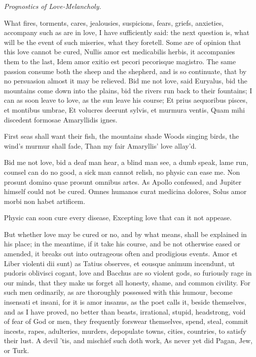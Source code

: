 
\emph{Prognostics of Love-Melancholy.}

What fires, torments, cares, jealousies, suspicions, fears, griefs,
anxieties, accompany such as are in love, I have sufficiently said: the
next question is, what will be the event of such miseries, what they
foretell. Some are of opinion that this love cannot be cured, Nullis
amor est medicabilis herbis, it accompanies them to the last,
Idem amor exitio est pecori pecorisque magistro. The same passion
consume both the sheep and the shepherd, and is so continuate, that by
no persuasion almost it may be relieved. Bid me not love, said
Euryalus, bid the mountains come down into the plains, bid the rivers
run back to their fountains; I can as soon leave to love, as the sun
leave his course;
Et prius aequoribus pisces, et montibus umbrae,
Et volucres deerunt sylvis, et murmura ventis,
Quam mihi discedent formosae Amaryllidis ignes.

First seas shall want their fish, the mountains shade
Woods singing birds, the wind's murmur shall fade,
Than my fair Amaryllis' love allay'd.

Bid me not love, bid a deaf man hear, a blind man see, a dumb speak,
lame run, counsel can do no good, a sick man cannot relish, no physic
can ease me. Non prosunt domino quae prosunt omnibus artes. As Apollo
confessed, and Jupiter himself could not be cured.
Omnes humanos curat medicina dolores,
Solus amor morbi non habet artificem.

Physic can soon cure every disease,
Excepting love that can it not appease.

But whether love may be cured or no, and by what means, shall be
explained in his place; in the meantime, if it take his course, and be
not otherwise eased or amended, it breaks out into outrageous often and
prodigious events. Amor et Liber violenti dii sunt) as Tatius
observes, et eousque animum incendunt, ut pudoris oblivisci cogant,
love and Bacchus are so violent gods, so furiously rage in our minds,
that they make us forget all honesty, shame, and common civility. For
such men ordinarily, as are thoroughly possessed with this humour,
become insensati et insani, for it is amor insanus, as the poet
calls it, beside themselves, and as I have proved, no better than
beasts, irrational, stupid, headstrong, void of fear of God or men,
they frequently forswear themselves, spend, steal, commit incests,
rapes, adulteries, murders, depopulate towns, cities, countries, to
satisfy their lust.
A devil 'tis, and mischief such doth work,
As never yet did Pagan, Jew, or Turk.

